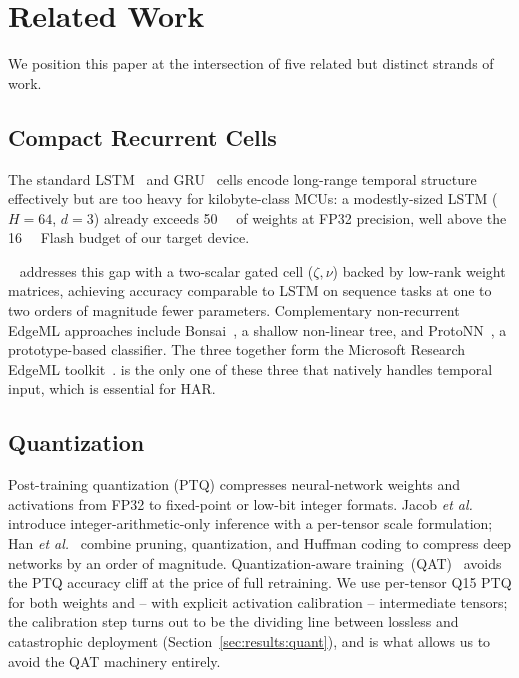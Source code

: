 \section{Related Work}
\label{sec:related}

We position this paper at the intersection of five related but
distinct strands of work.

\subsection{Compact Recurrent Cells}

The standard LSTM~\cite{hochreiter1997lstm} and
GRU~\cite{cho2014gru} cells encode long-range temporal structure
effectively but are too heavy for kilobyte-class MCUs: a
modestly-sized LSTM ($H{=}64$, $d{=}3$) already exceeds
\SI{50}{\kilo\byte} of weights at FP32 precision, well above the
\SI{16}{\kilo\byte} Flash budget of our target device.

\fastgrnn{}~\cite{kusupati2018fastgrnn} addresses this gap with a
two-scalar gated cell ($\zeta, \nu$) backed by low-rank weight
matrices, achieving accuracy comparable to LSTM on sequence tasks
at one to two orders of magnitude fewer parameters. Complementary
non-recurrent EdgeML approaches include
Bonsai~\cite{kumar2017bonsai}, a shallow non-linear tree, and
ProtoNN~\cite{gupta2017protonn}, a prototype-based classifier.
The three together form the Microsoft Research EdgeML
toolkit~\cite{edgeml}. \fastgrnn{} is the only one of these three
that natively handles temporal input, which is essential for HAR.

\subsection{Quantization}

Post-training quantization (PTQ) compresses neural-network weights
and activations from FP32 to fixed-point or low-bit integer
formats. Jacob \emph{et al.}~\cite{jacob2018integer} introduce
integer-arithmetic-only inference with a per-tensor scale
formulation; Han \emph{et al.}~\cite{han2016deepcompression}
combine pruning, quantization, and Huffman coding to compress deep
networks by an order of magnitude.
Quantization-aware training~(QAT)~\cite{hubara2017qnn} avoids the
PTQ accuracy cliff at the price of full retraining. We use
per-tensor Q15 PTQ for both weights and -- with explicit activation
calibration -- intermediate tensors; the calibration step turns
out to be the dividing line between lossless and catastrophic
deployment (Section~\ref{sec:results:quant}), and is what allows
us to avoid the QAT machinery entirely.

